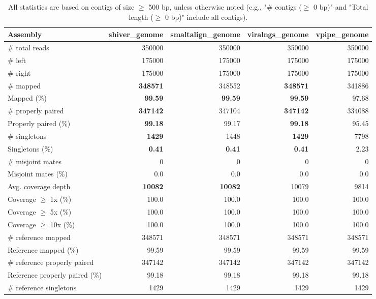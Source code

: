 \documentclass[12pt,a4paper]{article}
\begin{document}
\begin{table}[ht]
\begin{center}
\caption{All statistics are based on contigs of size $\geq$ 500 bp, unless otherwise noted (e.g., "\# contigs ($\geq$ 0 bp)" and "Total length ($\geq$ 0 bp)" include all contigs).}
\begin{tabular}{|l*{4}{|r}|}
\hline
Assembly & shiver\_genome & smaltalign\_genome & viralngs\_genome & vpipe\_genome \\ \hline
\# total reads & 350000 & 350000 & 350000 & 350000 \\ \hline
\# left & 175000 & 175000 & 175000 & 175000 \\ \hline
\# right & 175000 & 175000 & 175000 & 175000 \\ \hline
\# mapped & {\bf 348571} & 348552 & {\bf 348571} & 341886 \\ \hline
Mapped (\%) & {\bf 99.59} & {\bf 99.59} & {\bf 99.59} & 97.68 \\ \hline
\# properly paired & {\bf 347142} & 347104 & {\bf 347142} & 334088 \\ \hline
Properly paired (\%) & {\bf 99.18} & 99.17 & {\bf 99.18} & 95.45 \\ \hline
\# singletons & {\bf 1429} & 1448 & {\bf 1429} & 7798 \\ \hline
Singletons (\%) & {\bf 0.41} & {\bf 0.41} & {\bf 0.41} & 2.23 \\ \hline
\# misjoint mates & 0 & 0 & 0 & 0 \\ \hline
Misjoint mates (\%) & 0.0 & 0.0 & 0.0 & 0.0 \\ \hline
Avg. coverage depth & {\bf 10082} & {\bf 10082} & 10079 & 9814 \\ \hline
Coverage $\geq$ 1x (\%) & 100.0 & 100.0 & 100.0 & 100.0 \\ \hline
Coverage $\geq$ 5x (\%) & 100.0 & 100.0 & 100.0 & 100.0 \\ \hline
Coverage $\geq$ 10x (\%) & 100.0 & 100.0 & 100.0 & 100.0 \\ \hline
\# reference mapped & 348571 & 348571 & 348571 & 348571 \\ \hline
Reference mapped (\%) & 99.59 & 99.59 & 99.59 & 99.59 \\ \hline
\# reference properly paired & 347142 & 347142 & 347142 & 347142 \\ \hline
Reference properly paired (\%) & 99.18 & 99.18 & 99.18 & 99.18 \\ \hline
\# reference singletons & 1429 & 1429 & 1429 & 1429 \\ \hline

\end{tabular}
\end{center}
\end{table}
\end{document}
